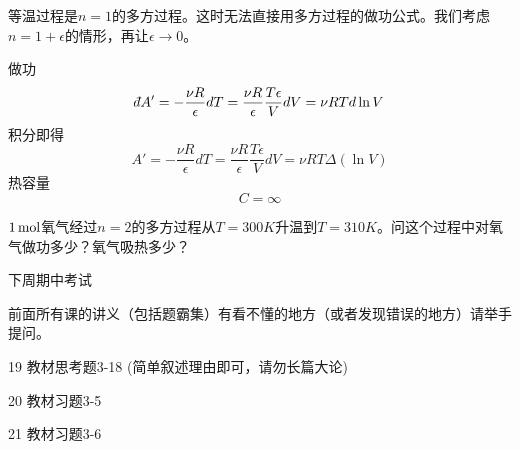 \documentclass[CJK]{beamer}
\begin{document}
\begin{frame}
\bch
\bex
等温过程是$n=1$的多方过程。这时无法直接用多方过程的做功公式。我们考虑$n=1+\epsilon$的情形，再让$\epsilon \rightarrow 0$。

做功
$$\dbar A' = -\frac{\nu R}{\epsilon}dT = \frac{\nu R}{\epsilon}\frac{T\epsilon}{V}dV = \nu RT d\ln V $$
积分即得
$$ A' = -\frac{\nu R}{\epsilon}dT = \frac{\nu R}{\epsilon}\frac{T\epsilon}{V}dV = \nu RT \Delta(\ln V) $$
热容量
$$C = \infty $$

\eex
\ech
\end{frame}


\begin{frame}
\bch
{}
$1\,\mathrm{mol}$氧气经过$n=2$的多方过程从$T=300K$升温到$T=310K$。问这个过程中对氧气做功多少？氧气吸热多少？
\ech
\end{frame}


\begin{frame}
\bch

下周期中考试


前面所有课的讲义（包括题霸集）有看不懂的地方（或者发现错误的地方）请举手提问。


\ech
\end{frame}


\begin{frame}
\bch
\bitem
\item[19]{教材思考题3-18 (简单叙述理由即可，请勿长篇大论)}
\item[20]{教材习题3-5}
\item[21]{教材习题3-6}
\eitem
\ech
\end{frame}
\end{document}
